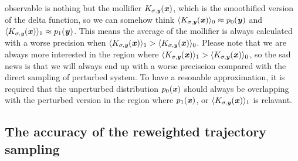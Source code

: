 \documentclass[aip,jcp,a4paper,reprint,onecolumn]{revtex4-1}
\newcommand{\vect}[1]{\textbf{\textit{#1}}}
\begin{document}
observable is nothing but the mollifier $K_{\sigma, \vect y}(\vect
x)$, which is the smoothified version of the delta function,
so we can somehow think
$\langle K_{\sigma, \vect y}(\vect x)\rangle_0
\approx p_0(\vect y)$ and
$\langle K_{\sigma, \vect y}(\vect x)\rangle_1
\approx p_1(\vect y)$.  This
means the average of the mollifier is always calculated with a worse
precision when $\langle K_{\sigma, \vect y}(\vect x)\rangle_1 >
\langle K_{\sigma, \vect y}(\vect x)\rangle_0$. Please note that we
are always more interested in the region where $\langle K_{\sigma,
  \vect y}(\vect x)\rangle_1 > \langle K_{\sigma, \vect y}(\vect
x)\rangle_0$, so the sad news is that we will always end up with
a worse preciseion compared with the direct sampling of perturbed
system.
To have a resonable approximation, it is required that
the unperturbed distribution $p_0(\vect x)$ should always be
overlapping with the perturbed version in the region where $p_1(\vect
x)$, or $\langle K_{\sigma, \vect y}(\vect x)\rangle_1$ is relavant.


\subsection{The accuracy of the reweighted trajectory sampling}
\end{document}
